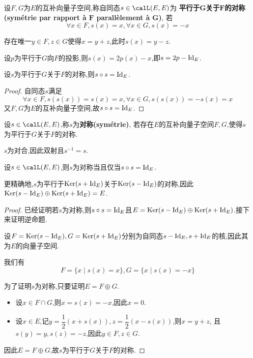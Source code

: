 \begin{deff}
    设$F,G$为$E$的互补向量子空间,称自同态$s \in \calL(E, E)$为
    \textbf{平行于$\boldsymbol{G}$关于$\boldsymbol{F}$的对称(symétrie par rapport à $\boldsymbol{F}$ parallèlement à $\boldsymbol{G}$)},
    若\[ \forall x \in F, s(x) = x, \forall x \in G, s(x) = -x \]
\end{deff}

\begin{rqq}
    存在唯一$y \in F, z \in G$使得$x = y + z$,此时$s(x) = y - z$.
\end{rqq}

\begin{rqq}
    设$p$为平行于$G$向$F$的投影,则$s(x) = 2p(x) - x$,即$s = 2p - \operatorname{Id}_E$.
\end{rqq}

\begin{prop}
    设$s$为平行于$G$关于$F$的对称,则$s \circ s = \operatorname{Id}_E$.
\end{prop}

\begin{proof}
    自同态$s$满足\[ \forall x \in F, s(s(x)) = s(x) = x, \forall x \in G, s(s(x)) = -s(x) = x \]
    又$F, G$为$E$的互补向量子空间,故$s \circ s = \operatorname{Id}_E$.
\end{proof}

\begin{deff}
    设$s \in \calL(E, E)$,称$s$为\textbf{对称(symétrie)},
    若存在$E$的互补向量子空间$F, G$,使得$s$为平行于$G$关于$F$的对称.
\end{deff}

\begin{rqq}
    $s$为对合,因此双射且$s^{-1} = s$.
\end{rqq}

\begin{prop}
    设$s \in \calL(E, E)$,则$s$为对称当且仅当$s \circ s = \operatorname{Id}_E$.

    更精确地,$s$为平行于$\operatorname{Ker}(s + \operatorname{Id}_E)$关于$\operatorname{Ker}(s - \operatorname{Id}_E)$的对称,因此$\operatorname{Ker}(s - \operatorname{Id}_E) \oplus \operatorname{Ker}(s + \operatorname{Id}_E) = E$.
\end{prop}

\begin{proof}
    已经证明若$s$为对称,则$s \circ s = \operatorname{Id}_E$且$E = \operatorname{Ker}(s - \operatorname{Id}_E) \oplus \operatorname{Ker}(s + \operatorname{Id}_E)$.接下来证明逆命题.

    设$F = \operatorname{Ker}(s - \operatorname{Id}_E), G = \operatorname{Ker}(s + \operatorname{Id}_E)$分别为自同态$s - \operatorname{Id}_E, s + \operatorname{Id}_E$的核,因此其为$E$的向量子空间.

    我们有\[ F = \{ x \mid s(x) = x \}, G = \{ x \mid s(x) = -x \} \]

    为了证明$s$为对称,只要证明$E = F \oplus G$.

    \begin{itemize}
        \item 设$x \in F \cap G$,则$x = s(x) = -x$,因此$x = 0$.
        \item 设$x \in E$,记$y = \dfrac{1}{2} (x + s(x)), z = \dfrac{1}{2} (x - s(x))$,则$x = y + z$,
            且$s(y) = y, s(z) = -z$,因此$y \in F, z \in G$.
    \end{itemize}

    因此$E = F \oplus G$,故$s$为平行于$G$关于$F$的对称.
\end{proof}

